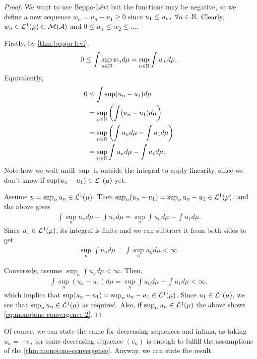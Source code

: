 \begin{proof}
	We want to use Beppo-Lévi but the functions may be negative, so we define a new sequence $w_n = u_n - u_1 \geq 0$ since $u_1 \leq u_n,\ \forall n \in \mathbb{N}$. Clearly, $w_n \in \mathcal{L}^1(\mu) \subset \mathcal{M}(\mathcal{A})$ and $0 \leq w_1 \leq w_2 \leq \dots$.
	
	Firstly, by \autoref{thm:beppo-levi},
	\begin{align*}
		0 \leq \int \sup_{n\in\mathbb{N}} w_n d\mu = \sup_{n\in\mathbb{N}} \int w_n d\mu. 
	\end{align*}
	Equivalently,
	\begin{align*}
		0 &\leq \int \sup(u_n - u_1)d\mu \\
		&= \sup_{n\in\mathbb{N}}\left(\int (u_n - u_1)d\mu \right)  \\
		&= \sup_{n\in\mathbb{N}}\left( \int u_n d\mu - \int u_1 d\mu \right) \\
		&= \sup_{n\in\mathbb{N}}\int u_n d\mu - \int u_1 d\mu.
	\end{align*}
	Note how we wait until $\sup$ is outside the integral to apply linearity, since we don't know if $\sup(u_n - u_1) \in \mathcal{L}^1(\mu)$ yet.
	
	Assume $u = \sup_n u_n \in \mathcal{L}^1(\mu)$. Then $\sup_n (u_n - u_1) = \sup_n u_n - u_1 \in \mathcal{L}^1(\mu)$, and the above gives
	\begin{align*}
		\int \sup_n u_n d\mu - \int u_1 d\mu = \sup_n \int u_n d\mu - \int u_1 d\mu.
	\end{align*}
	Since $u_1 \in \mathcal{L}^1(\mu)$, its integral is finite and we can subtract it from both sides to get
	\begin{align*}
		\sup_n \int u_n d\mu = \int \sup_n u_n d\mu < \infty.
	\end{align*}
	
	Conversely, assume $\sup_n \int u_n d\mu < \infty$. Then,
	\begin{align*}
		\int \sup_n (u_n - u_1)d\mu = \sup_n \int u_n d\mu - \int u_1 d\mu < \infty,
	\end{align*}
	which implies that $\sup(u_n - u_1) = \sup_n u_n - u_1 \in \mathcal{L}^1(\mu)$. Since $u_1 \in \mathcal{L}^1(\mu)$, we see that $\sup_n u_n \in \mathcal{L}^1(\mu)$ as required. Also, if $\sup_n u_n \in \mathcal{L}^1(\mu)$ the above shows \autoref{eq:monotone-convergence-2}.
\end{proof}

Of course, we can state the same for decreasing sequences and infima, as taking $u_n = - v_n$ for some decreasing sequence $(v_n)$ is enough to fulfill the assumptions of the \autoref{thm:monotone-convergence}. Anyway, we can state the result.

